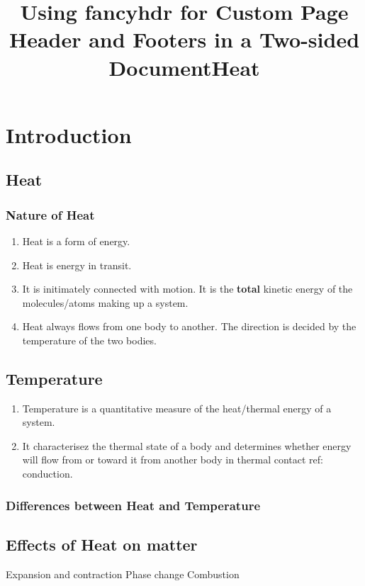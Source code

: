 \documentclass[12pt]{book}
\title{Using fancyhdr for Custom Page Header and Footers in a Two-sided Document}
\begin{document}
\title{Heat}
\setcounter{page}{1}
\maketitle
\chapter{Introduction}


\section{Heat}

\subsection*{Nature of Heat}
\begin{enumerate}
    \item Heat is a form of energy.
    \item Heat is energy in transit. 
    \item It is initimately connected with motion. It is the \textbf{total} kinetic energy 
    of the molecules/atoms making up a system. 
    \item Heat always flows from one body to another. The direction is decided by the temperature
    of the two bodies. 
\end{enumerate}
\section{Temperature}
\begin{enumerate}
\item Temperature is a quantitative measure of the heat/thermal energy of a system. 
\item It characterisez the thermal state of a body and determines whether energy will flow 
from or toward it from another body in thermal contact {ref: conduction}.

\end{enumerate}

\subsection{Differences between Heat and Temperature}
 
\section{Effects of Heat on matter}
Expansion and contraction
Phase change
Combustion
\end{document}
